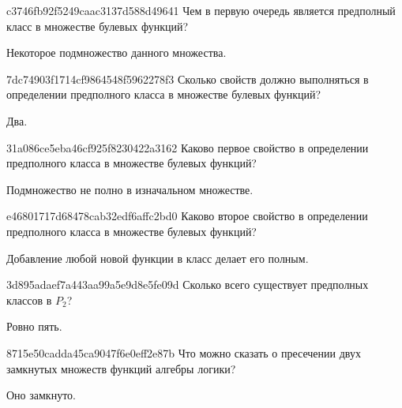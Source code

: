 \begin{note}{c3746fb92f5249caac3137d588d49641}
    Чем в первую очередь является предполный класс в множестве булевых функций?

    \begin{cloze}{1}
        Некоторое подмножество данного множества.
    \end{cloze}
\end{note}

\begin{note}{7dc74903f1714cf9864548f5962278f3}
    Сколько свойств должно выполняться в определении предполного класса в множестве булевых функций?

    \begin{cloze}{1}
        Два.
    \end{cloze}
\end{note}

\begin{note}{31a086ce5eba46cf925f8230422a3162}
    Каково первое свойство в определении предполного класса в множестве булевых функций?

    \begin{cloze}{1}
        Подмножество не полно в изначальном множестве.
    \end{cloze}
\end{note}

\begin{note}{e46801717d68478cab32edf6affc2bd0}
    Каково второе свойство в определении предполного класса в множестве булевых функций?

    \begin{cloze}{1}
        Добавление любой новой функции в класс делает его полным.
    \end{cloze}
\end{note}

\begin{note}{3d895adaef7a443aa99a5e9d8e5fe09d}
    Сколько всего существует предполных классов в \({ P_2 }\)?

    \begin{cloze}{1}
        Ровно пять.
    \end{cloze}
\end{note}

\begin{note}{8715e50cadda45ca9047f6e0eff2e87b}
    Что можно сказать о пресечении двух замкнутых множеств функций алгебры логики?

    \begin{cloze}{1}
        Оно замкнуто.
    \end{cloze}
\end{note}

